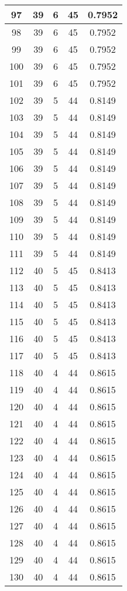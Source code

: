 \documentclass[letterpaper, 12pt]{article}
\begin{document}
\begin{longtable}{|c|c|c|c|c|}
\hline
97 & 39 & 6 & 45 & 0.7952 \\
\hline
98 & 39 & 6 & 45 & 0.7952 \\
\hline
99 & 39 & 6 & 45 & 0.7952 \\
\hline
100 & 39 & 6 & 45 & 0.7952 \\
\hline
101 & 39 & 6 & 45 & 0.7952 \\
\hline
102 & 39 & 5 & 44 & 0.8149 \\
\hline
103 & 39 & 5 & 44 & 0.8149 \\
\hline
104 & 39 & 5 & 44 & 0.8149 \\
\hline
105 & 39 & 5 & 44 & 0.8149 \\
\hline
106 & 39 & 5 & 44 & 0.8149 \\
\hline
107 & 39 & 5 & 44 & 0.8149 \\
\hline
108 & 39 & 5 & 44 & 0.8149 \\
\hline
109 & 39 & 5 & 44 & 0.8149 \\
\hline
110 & 39 & 5 & 44 & 0.8149 \\
\hline
111 & 39 & 5 & 44 & 0.8149 \\
\hline
112 & 40 & 5 & 45 & 0.8413 \\
\hline
113 & 40 & 5 & 45 & 0.8413 \\
\hline
114 & 40 & 5 & 45 & 0.8413 \\
\hline
115 & 40 & 5 & 45 & 0.8413 \\
\hline
116 & 40 & 5 & 45 & 0.8413 \\
\hline
117 & 40 & 5 & 45 & 0.8413 \\
\hline
118 & 40 & 4 & 44 & 0.8615 \\
\hline
119 & 40 & 4 & 44 & 0.8615 \\
\hline
120 & 40 & 4 & 44 & 0.8615 \\
\hline
121 & 40 & 4 & 44 & 0.8615 \\
\hline
122 & 40 & 4 & 44 & 0.8615 \\
\hline
123 & 40 & 4 & 44 & 0.8615 \\
\hline
124 & 40 & 4 & 44 & 0.8615 \\
\hline
125 & 40 & 4 & 44 & 0.8615 \\
\hline
126 & 40 & 4 & 44 & 0.8615 \\
\hline
127 & 40 & 4 & 44 & 0.8615 \\
\hline
128 & 40 & 4 & 44 & 0.8615 \\
\hline
129 & 40 & 4 & 44 & 0.8615 \\
\hline
130 & 40 & 4 & 44 & 0.8615 \\

\end{longtable}
\end{document}
